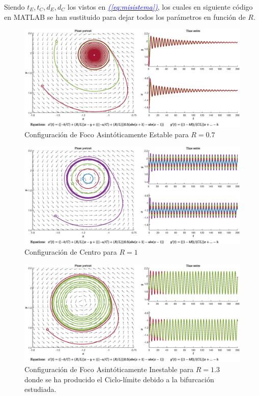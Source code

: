 \documentclass[12pt,a4paper]{report} %
\newcommand{\eref}[1]{\hyperref[#1]{\textcolor{blue}{\textit{(\ref*{#1})}}}}
\begin{document}
	\vspace{0.5cm}Siendo $t_E,t_C,d_E,d_C$ los vistos en \eref{eq:misistema}, los cuales en siguiente código en MATLAB se han sustituido para dejar todos los parámetros en función de $R$.
	
	\begin{figure}[h]
		\centering
		\includegraphics[width=1\textwidth]{r0.7.eps}
		\caption{Configuración de Foco Asintóticamente Estable para $R=0.7$}
		\label{fig:r0.7}
	\end{figure}
	\begin{figure}[h]
		\centering
		\includegraphics[width=1\textwidth]{r1.eps}
		\caption{Configuración de Centro para $R=1$}
		\label{fig:r1}
	\end{figure}
	
	\newpage
	
	\begin{figure}[h]
		\centering
		\includegraphics[width=1\textwidth]{r1.3.eps}
		\caption{Configuración de Foco Asintóticamente Inestable para $R=1.3$ donde se ha producido el Ciclo-límite debido a la bifurcación estudiada.}
		\label{fig:r1.3}
	\end{figure}\smallskip
	
\end{document}
